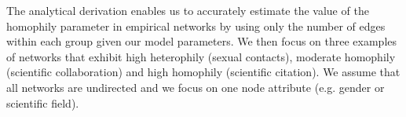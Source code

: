 
 






The analytical derivation enables us to accurately estimate the value of the homophily parameter in empirical networks by using only the number of edges within each group given our model parameters. We then focus on three examples of networks that exhibit high heterophily (sexual contacts), moderate homophily (scientific collaboration) and high homophily (scientific citation). We assume that all networks are undirected and we focus on one node attribute (e.g. gender or scientific field).


